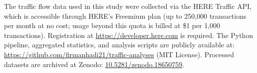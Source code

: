 \documentclass[review,authoryear]{elsarticle}
\begin{document}
The traffic flow data used in this study were collected via the HERE Traffic API, which is accessible through HERE's Freemium plan (up to 250,000 transactions per month at no cost; usage beyond this quota is billed at \$1 per 1,000 transactions). Registration at \url{https://developer.here.com} is required. The Python pipeline, aggregated statistics, and analysis scripts are publicly available at: \url{https://github.com/firmanhadi21/traffic-analyses} (MIT License). Processed datasets are archived at Zenodo: \href{https://doi.org/10.5281/zenodo.18650759}{10.5281/zenodo.18650759}.



\end{document}

